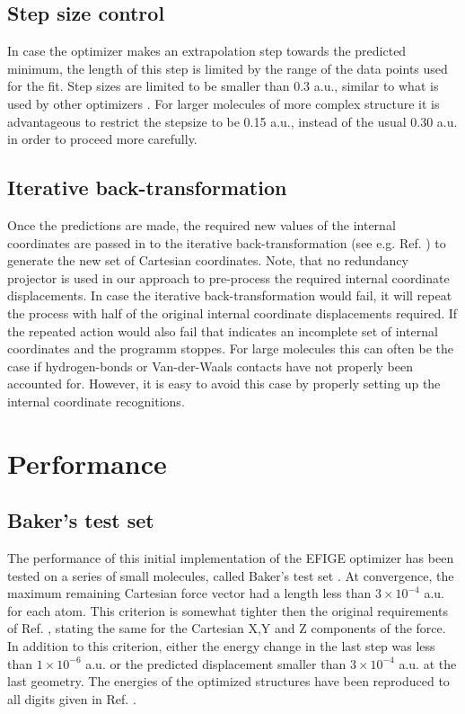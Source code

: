 \documentclass[prl,twocolumn,showpacs,twocolumngrid,superbib]{revtex4}
\begin{document}
\subsection{Step size control}
In case the optimizer makes an extrapolation step towards the predicted
minimum, the length of this step is limited by the range of the
data points used for the fit. Step sizes are limited to be smaller
than 0.3 a.u., similar to what is used by other optimizers 
\cite{eckert}.
For larger molecules of more complex structure 
it is advantageous to restrict
the stepsize to be 0.15 a.u., instead of the usual 0.30 a.u. 
in order to proceed more carefully.

\subsection{Iterative back-transformation}
Once the predictions are made, the required new values of the internal
coordinates are passed in to the iterative back-transformation
(see e.g. Ref. \cite{nemeth_coordtrf1})
to generate the new set of Cartesian coordinates. Note, that no
redundancy projector is used in our approach to pre-process the
required internal coordinate displacements. In case the iterative 
back-transformation would fail, it will repeat the process with 
half of the original
internal coordinate displacements required. If the repeated action 
would also fail that indicates an incomplete set of internal coordinates
and the programm stoppes. For large molecules this can often be the case
if hydrogen-bonds or Van-der-Waals contacts have not properly been 
accounted for. However, it is easy to avoid this case by properly 
setting up the internal coordinate recognitions.

\section{Performance}
\subsection{Baker's test set}
The performance of this initial implementation of the EFIGE optimizer
has been tested on a 
series of small molecules, called Baker's test set \cite{bakerstest}.
At convergence, the maximum remaining Cartesian
force vector had a length less than $3\times10^{-4}$ a.u. for each
atom. This criterion is somewhat tighter then the original requirements
of Ref. \cite{bakerstest}, stating the same for the Cartesian X,Y and Z
components of the force. 
In addition to this criterion, either the energy change in the last step
was less than $1\times10^{-6}$ a.u. or the predicted displacement
smaller than $3\times10^{-4}$ a.u. at the last geometry.
The energies of the optimized
structures have been reproduced to all digits given in 
Ref. \cite{bakerstest}.
\end{document}
